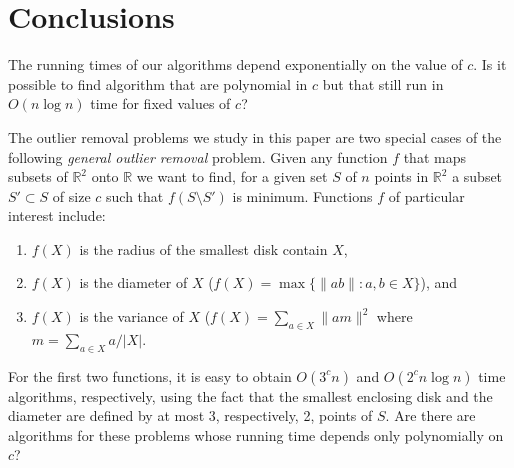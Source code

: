 \documentclass[lotsofwhite]{patmorin}
\begin{document}
\section{Conclusions}

The running times of our algorithms depend exponentially on the value
of $c$.  Is it possible to find algorithm that are polynomial in $c$
but that still run in $O(n\log n)$ time for fixed values of $c$?

The outlier removal problems we study in this paper are two special
cases of the following \emph{general outlier removal} problem.  Given
any function $f$ that maps subsets of $\mathbb{R}^2$ onto $\mathbb{R}$
we want to find, for a given set $S$ of $n$ points in $\mathbb{R}^2$ a
subset $S'\subset S$ of size $c$ such that $f(S\setminus S')$ is
minimum.  Functions $f$ of particular interest include:
\begin{enumerate}
\item $f(X)$ is the radius of the smallest disk contain $X$,
\item $f(X)$ is the diameter of $X$ ($f(X)=\max\{\|ab\|:a,b\in X\}$), and
\item $f(X)$ is the variance of $X$ ($f(X)=\sum_{a\in X} \| am \|^2$
where $m=\sum_{a\in X} a/|X|$.
\end{enumerate}
For the first two functions, it is easy to obtain $O(3^c n)$ and
$O(2^cn\log n)$ time algorithms, respectively, using the fact that the
smallest enclosing disk and the diameter are defined by at most 3,
respectively, 2, points of $S$.  Are there are algorithms for these
problems whose running time depends only polynomially on $c$?
\end{document}
